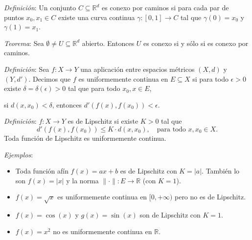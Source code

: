 \documentclass{beamer}
\begin{document}
  \begin{frame}
    \textit{Definición}: Un conjunto $C \subseteq \mathbb{R}^d$ es conexo por caminos si 
    para cada par de puntos $x_0, x_1 \in C$ existe una curva continua 
    $\gamma: [0, 1] \to C$ tal que $\gamma(0) = x_0$ y $\gamma(1) = x_1$.
    \newline\newline
    \pause

    \textit{Teorema}: Sea $\emptyset \neq U \subseteq \mathbb{R}^d$ abierto. Entonces $U$ es 
    conexo si y sólo si es conexo por caminos.
  \end{frame}

  \begin{frame}
    \textit{Definición}: Sea $f: X \to Y$ una aplicación entre espacios métricos 
    $(X, d)$ y $(Y, d')$. Decimos que $f$ es uniformemente continua en $E \subseteq X$ 
    si para todo $\epsilon > 0$ existe $\delta = \delta(\epsilon) > 0$ tal que para todo 
    $x_0, x \in E$,
    \begin{center}
      si $d(x, x_0) < \delta$, entonces $d'(f(x), f(x_0)) < \epsilon$.
    \end{center}
    \pause

    \textit{Definición}: $f: X \to Y$ es de Lipschitz si existe $K > 0$ tal que
    \[
      d'(f(x), f(x_0)) \leq K \cdot d(x, x_0), \quad \text{para todo } x, x_0 \in X.
    \]
    Toda función de Lipschitz es uniformemente continua.
  \end{frame}

  \begin{frame}
    \textit{Ejemplos}:
    \begin{itemize}[<+->]
      \item Toda función afín $f(x) = ax + b$ es de Lipschitz con $K = |a|$. También lo 
      son $f(x) = |x|$ y la norma $\|\cdot\|: E \to \mathbb{R}$ (con $K = 1$).
      \item $f(x) = \sqrt{x}$ es uniformemente continua en $[0, +\infty)$ pero no es de 
      Lipschitz.
      \item $f(x) = \cos(x)$ y $g(x) = \sin(x)$ son de Lipschitz con $K = 1$.
      \item $f(x) = x^2$ no es uniformemente continua en $\mathbb{R}$.
    \end{itemize}
  \end{frame}
\end{document}
